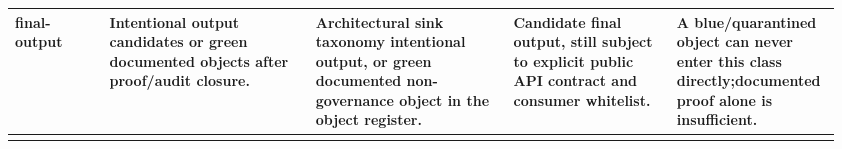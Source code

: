 \begin{longtable}{L{0.115\linewidth} L{0.245\linewidth} L{0.23\linewidth} L{0.19\linewidth} L{0.18\linewidth}}
\hline
\addlinespace[0.24em]
final-output & Intentional output candidates or green documented objects after proof/\allowbreak{}audit closure. & Architectural sink taxonomy intentional output, or green documented non-governance object in the object register. & Candidate final output, still subject to explicit public API contract and consumer whitelist. & A blue/\allowbreak{}quarantined object can never enter this class directly;\newline documented proof alone is insufficient.\\
\hline
\addlinespace[0.24em]
\end{longtable}
\normalsize
